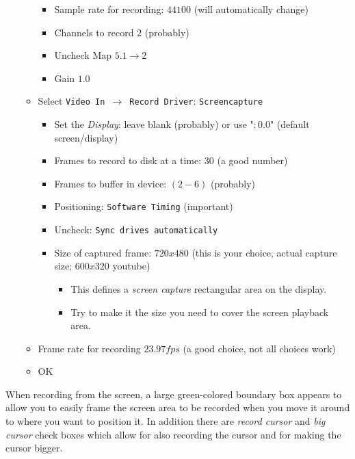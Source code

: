 \begin{enumerate}
\begin{itemize}
\begin{itemize}
            \item Sample rate for recording: $44100$ (will automatically change)
            \item Channels to record $2$ (probably)
            \item Uncheck Map $5.1 \rightarrow 2$
            \item Gain $1.0$
        \end{itemize}
        \item Select \texttt{Video In $\rightarrow$ Record Driver}:  \texttt{Screencapture}
        \begin{itemize}
            \item Set the \textit{Display}: leave blank (probably) or use "$:0.0$" (default screen/display)
            \item Frames to record to disk at a time: $30$ (a good number)
            \item Frames to buffer in device: $(2-6)$ (probably)
            \item Positioning: \texttt{Software Timing} (important)
            \item Uncheck: \texttt{Sync drives automatically}
            \item Size of captured frame: $720x480$ (this is your choice, actual capture size; $600x320$ youtube)
            \begin{itemize}
                \item This defines a \textit{screen capture} rectangular area on the display.
                \item Try to make it the size you need to cover the screen playback area.
            \end{itemize}       
        \end{itemize}
        \item Frame rate for recording $23.97 fps$ (a good choice, not all choices work)
        \item OK
    \end{itemize}
    
\end{enumerate}

When recording from the screen, a large green-colored boundary box appears to allow you to easily frame the screen area to be recorded when you move it around to where you want to position it.  In addition there are \textit{record cursor} and \textit{big cursor} check boxes which allow for also recording the cursor and for making the cursor bigger.

